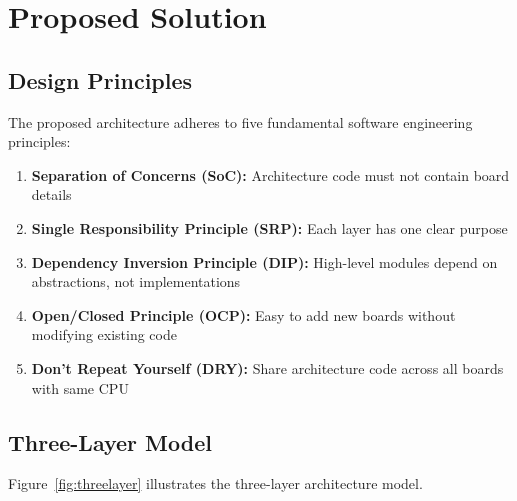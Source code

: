 \documentclass[11pt,a4paper]{article}
\begin{document}
\section{Proposed Solution}

\subsection{Design Principles}

The proposed architecture adheres to five fundamental software engineering principles:

\begin{enumerate}
    \item \textbf{Separation of Concerns (SoC):} Architecture code must not contain board details
    \item \textbf{Single Responsibility Principle (SRP):} Each layer has one clear purpose
    \item \textbf{Dependency Inversion Principle (DIP):} High-level modules depend on abstractions, not implementations
    \item \textbf{Open/Closed Principle (OCP):} Easy to add new boards without modifying existing code
    \item \textbf{Don't Repeat Yourself (DRY):} Share architecture code across all boards with same CPU
\end{enumerate}

\subsection{Three-Layer Model}

Figure~\ref{fig:threelayer} illustrates the three-layer architecture model.
\end{document}
